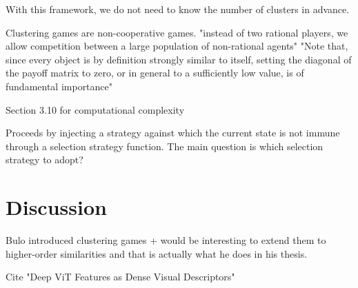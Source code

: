 \documentclass[11pt,a4paper]{article}
\begin{document}
With this framework, we do not need to know the number of clusters in advance.

Clustering games are non-cooperative games. "instead of two rational players, we allow competition between a large population of non-rational agents" "Note that, since every object is by definition strongly similar to itself, setting the diagonal of the payoff matrix to zero, or in general to a sufficiently low value, is of fundamental importance"

Section 3.10 for computational complexity

Proceeds by injecting a strategy against which the current state is not immune through a selection strategy function. The main question is which selection strategy to adopt?

\section{Discussion}

Bulo introduced clustering games + would be interesting to extend them to higher-order similarities and that is actually what he does in his thesis.

Cite "Deep ViT Features as Dense Visual Descriptors"



\end{document}
